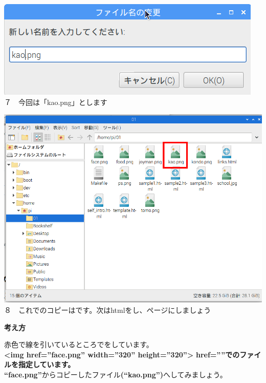 \documentclass[a4paper,12pt]{jarticle}
\begin{document}
\begin{minipage}{0.45\linewidth}
  \includegraphics[width=\linewidth]{textbook-img166.png}\\
  ７　今回は「kao.png」とします
\end{minipage}
\hfill
\vspace{20pt}
\begin{minipage}{0.45\linewidth}
  \includegraphics[width=\linewidth]{textbook-img170.png}\\
  ８　これでのコピーはです。次はhtmlをし、ページにしましょう
\end{minipage}

\clearpage
\flushleft
\textbf{考え方}\ \


赤色で線を引いているところでをしています。\\
\textbf{{\textless}img href=”face.png” width=”320” height=”320”{\textgreater}}
\textbf{href=””でのファイルを指定しています。}\\
\textbf{“face.png”}からコピーしたファイル\textbf{(“kao.png”)}へしてみましょう。
\end{document}
